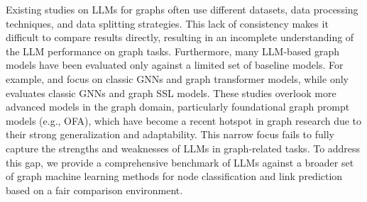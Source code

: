 Existing studies \cite{tang2024graphgpt, zhao2023graphtext, li2024glbench} on LLMs for graphs often use different datasets, data processing techniques, and data splitting strategies. This lack of consistency makes it difficult to compare results directly, resulting in an incomplete understanding of the LLM performance on graph tasks.
Furthermore, many LLM-based graph models have been evaluated only against a limited set of baseline models. For example, \cite{yan2023comprehensive} and \cite{instructglm} focus on classic GNNs and graph transformer models, while \cite{tang2024graphgpt} only evaluates classic GNNs and graph SSL models. These studies overlook more advanced models in the graph domain, particularly foundational graph prompt models (e.g., OFA), which have become a recent hotspot in graph research due to their strong generalization and adaptability. This narrow focus fails to fully capture the strengths and weaknesses of LLMs in graph-related tasks. To address this gap, we provide a comprehensive benchmark of LLMs against a broader set of graph machine learning methods for node classification and link prediction based on a fair comparison environment.



